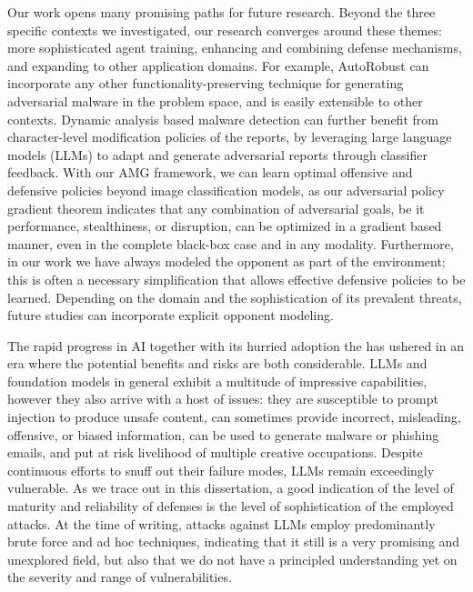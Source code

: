 Our work opens many promising paths for future research.
Beyond the three specific contexts we investigated, our research converges around these themes: more sophisticated agent training, enhancing and combining defense mechanisms, and expanding to other application domains.
For example, AutoRobust can incorporate any other functionality-preserving technique for generating adversarial malware in the problem space, and is easily extensible to other contexts.
Dynamic analysis based malware detection can further benefit from character-level modification policies of the reports, by leveraging large language models (LLMs) to adapt and generate adversarial reports through classifier feedback.
With our AMG framework, we can learn optimal offensive and defensive policies beyond image classification models, as our adversarial policy gradient theorem indicates that any combination of adversarial goals, be it performance, stealthiness, or disruption, can be optimized in a gradient based manner, even in the complete black-box case and in any modality.
Furthermore, in our work we have always modeled the opponent as part of the environment; this is often a necessary simplification that allows effective defensive policies to be learned.
Depending on the domain and the sophistication of its prevalent threats, future studies can incorporate explicit opponent modeling.

The rapid progress in \gls{AI} together with its hurried adoption the has ushered in an era where the potential benefits and risks are both considerable.
LLMs and foundation models in general exhibit a multitude of impressive capabilities, however they also arrive with a host of issues: they are susceptible to prompt injection to produce unsafe content, can sometimes provide incorrect, misleading, offensive, or biased information, can be used to generate malware or phishing emails, and put at risk livelihood of multiple creative occupations.
Despite continuous efforts to snuff out their failure modes, LLMs remain exceedingly vulnerable.
As we trace out in this dissertation, a good indication of the level of maturity and reliability of defenses is the level of sophistication of the employed attacks.
At the time of writing, attacks against LLMs employ predominantly brute force and ad hoc techniques, indicating that it still is a very promising and unexplored field, but also that we do not have a principled understanding yet on the severity and range of vulnerabilities.

